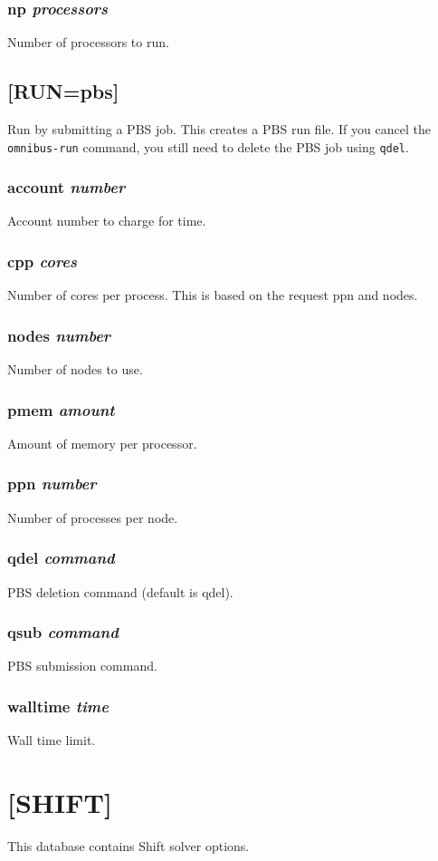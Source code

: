 \documentclass[10pt]{article}
\begin{document}
\subsubsection{np \textit{processors}}
Number of processors to run.

\subsection{[RUN=pbs]}
Run by submitting a PBS job. This creates a PBS run file. If you cancel the \texttt{omnibus-run} command, you still need to delete the PBS job using \texttt{qdel}. 

\subsubsection{account \textit{number}}
Account number to charge for time. 
\subsubsection{cpp \textit{cores}}
Number of cores per process. This is based on the request ppn and nodes. 
\subsubsection{nodes \textit{number}}
Number of nodes to use.
\subsubsection{pmem \textit{amount}}
Amount of memory per processor.
\subsubsection{ppn \textit{number}}
Number of processes per node. 
\subsubsection{qdel \textit{command}}
PBS deletion command (default is qdel).
\subsubsection{qsub \textit{command}}
PBS submission command. 
\subsubsection{walltime \textit{time}}
Wall time limit. 

\section{[SHIFT]}
This database contains Shift solver options. 
\end{document}
